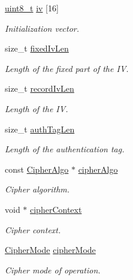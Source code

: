 \begin{DoxyCompactItemize}
\hyperlink{stdint_8h_aba7bc1797add20fe3efdf37ced1182c5}{uint8\+\_\+t} \hyperlink{structTlsEncryptionEngine_af7dda7e3510e4e13458a16c5357143f7}{iv} \mbox{[}16\mbox{]}
\begin{DoxyCompactList}\small\item\em Initialization vector. \end{DoxyCompactList}\item 
size\+\_\+t \hyperlink{structTlsEncryptionEngine_a40318ca61231c157990a287f4a9c0e2a}{fixed\+Iv\+Len}
\begin{DoxyCompactList}\small\item\em Length of the fixed part of the IV. \end{DoxyCompactList}\item 
size\+\_\+t \hyperlink{structTlsEncryptionEngine_a9b9d6c4c5f58c7dd0e040818fe6a2681}{record\+Iv\+Len}
\begin{DoxyCompactList}\small\item\em Length of the IV. \end{DoxyCompactList}\item 
size\+\_\+t \hyperlink{structTlsEncryptionEngine_aef28b3fa8d6ac0147cdc47db9a642fc7}{auth\+Tag\+Len}
\begin{DoxyCompactList}\small\item\em Length of the authentication tag. \end{DoxyCompactList}\item 
const \hyperlink{structCipherAlgo}{Cipher\+Algo} $\ast$ \hyperlink{structTlsEncryptionEngine_a2ba455619112e97e419c3c51de90b0ca}{cipher\+Algo}
\begin{DoxyCompactList}\small\item\em Cipher algorithm. \end{DoxyCompactList}\item 
void $\ast$ \hyperlink{structTlsEncryptionEngine_a6fb752231a2f6d7d6789c35481af0559}{cipher\+Context}
\begin{DoxyCompactList}\small\item\em Cipher context. \end{DoxyCompactList}\item 
\hyperlink{cyclone__crypto_2core_2crypto_8h_ac3adaabf9bad553901589ddf3de6daf5}{Cipher\+Mode} \hyperlink{structTlsEncryptionEngine_ac7326a9b894b4447ed52df0baa65b294}{cipher\+Mode}
\begin{DoxyCompactList}\small\item\em Cipher mode of operation. \end{DoxyCompactList}\item 

\end{DoxyCompactItemize}
